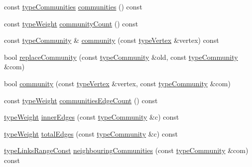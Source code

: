 \begin{DoxyCompactItemize}
const \hyperlink{graphUndirectedGroupable_8h_ab79c7252155ca17cb49aa0b1fea30116}{type\+Communities} \hyperlink{classGraphUndirectedGroupable_a57f8ea4cff0d83b80cca2dc8e8e19ff6}{communities} () const
\item 
const \hyperlink{edge_8h_a2e7ea3be891ac8b52f749ec73fee6dd2}{type\+Weight} \hyperlink{classGraphUndirectedGroupable_adf6ebb83c3df6317f122a13650309ac4}{community\+Count} () const
\item 
const \hyperlink{graphUndirectedGroupable_8h_a914da95c9ea7f14f4b7f875c36818556}{type\+Community} \& \hyperlink{classGraphUndirectedGroupable_ad40474d566b3f9fbe9d132fbbe562ed5}{community} (const \hyperlink{edge_8h_a5fbd20c46956d479cb10afc9855223f6}{type\+Vertex} \&vertex) const
\item 
bool \hyperlink{classGraphUndirectedGroupable_af29e653d9578b955e47288e075ebf47f}{replace\+Community} (const \hyperlink{graphUndirectedGroupable_8h_a914da95c9ea7f14f4b7f875c36818556}{type\+Community} \&old, const \hyperlink{graphUndirectedGroupable_8h_a914da95c9ea7f14f4b7f875c36818556}{type\+Community} \&com)
\item 
bool \hyperlink{classGraphUndirectedGroupable_a7a9642a50ac522d9020afb9df211702f}{community} (const \hyperlink{edge_8h_a5fbd20c46956d479cb10afc9855223f6}{type\+Vertex} \&vertex, const \hyperlink{graphUndirectedGroupable_8h_a914da95c9ea7f14f4b7f875c36818556}{type\+Community} \&com)
\item 
const \hyperlink{edge_8h_a2e7ea3be891ac8b52f749ec73fee6dd2}{type\+Weight} \hyperlink{classGraphUndirectedGroupable_a71de0c0e2157841bb1526c321277449a}{communities\+Edge\+Count} () const
\item 
\hyperlink{edge_8h_a2e7ea3be891ac8b52f749ec73fee6dd2}{type\+Weight} \hyperlink{classGraphUndirectedGroupable_a1986c140fd9aba8063774372c971706d}{inner\+Edges} (const \hyperlink{graphUndirectedGroupable_8h_a914da95c9ea7f14f4b7f875c36818556}{type\+Community} \&c) const
\item 
\hyperlink{edge_8h_a2e7ea3be891ac8b52f749ec73fee6dd2}{type\+Weight} \hyperlink{classGraphUndirectedGroupable_a8aa795a6e0ae115d35937508c5aad401}{total\+Edges} (const \hyperlink{graphUndirectedGroupable_8h_a914da95c9ea7f14f4b7f875c36818556}{type\+Community} \&c) const
\item 
\hyperlink{graphInterface_8h_ae8d27008f15586bbf419af7ad2e0a48a}{type\+Links\+Range\+Const} \hyperlink{classGraphUndirectedGroupable_a48823a0162b95a72c22d0ab01a709e1f}{neighbouring\+Communities} (const \hyperlink{graphUndirectedGroupable_8h_a914da95c9ea7f14f4b7f875c36818556}{type\+Community} \&com) const

\end{DoxyCompactItemize}
